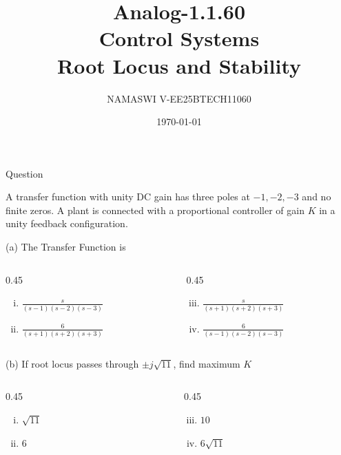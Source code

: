 \documentclass{beamer}
\title{Analog-1.1.60\\Control Systems\\Root Locus and Stability}
\author{NAMASWI V-EE25BTECH11060}
\date{\today}
\begin{document}
\begin{frame}
    \titlepage
\end{frame}


\begin{frame}{Question}

A transfer function with unity DC gain has three poles at $-1,-2,-3$ and no finite zeros. A plant is connected with a proportional controller of gain $K$ in a unity feedback configuration.

\vspace{0.3cm}

(a) The Transfer Function is 

\begin{columns}[t]
    \begin{column}{0.45\textwidth}
        \begin{enumerate}[i)]
            \item $\frac{s}{(s-1)(s-2)(s-3)}$
            \item $\frac{6}{(s+1)(s+2)(s+3)}$
        \end{enumerate}
    \end{column}
    
    \begin{column}{0.45\textwidth}
        \begin{enumerate}[i)]
            \setcounter{enumi}{2}
            \item $\frac{s}{(s+1)(s+2)(s+3)}$
            \item $\frac{6}{(s-1)(s-2)(s-3)}$
        \end{enumerate}
    \end{column}
\end{columns}

\vspace{0.2cm}

(b) If root locus passes through $\pm j\sqrt{11}$, find maximum $K$

\begin{columns}[t]
    \begin{column}{0.45\textwidth}
        \begin{enumerate}[i)]
            \item $\sqrt{11}$
            \item $6$
        \end{enumerate}
    \end{column}
    
    \begin{column}{0.45\textwidth}
        \begin{enumerate}[i)]
            \setcounter{enumi}{2}
            \item $10$
            \item $6\sqrt{11}$
        \end{enumerate}
    \end{column}
\end{columns}

\end{frame}
\end{document}
